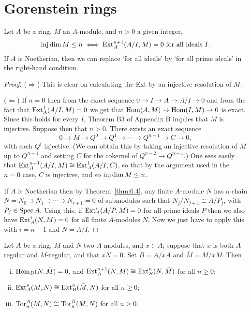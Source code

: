 \section{Gorenstein rings}\label{sec:18}

\begin{lemma}\label{lem:18.1}
Let $A$ be a ring, $M$ an $A$-module, and $n > 0$ a given integer,
\[
  \operatorname{inj\,dim} M \le n \iff \operatorname{Ext}^{n+1}_A(A/I, M) = 0 \text{ for all ideals } I.
\]
If $A$ is Noetherian, then we can replace `for all ideals' by `for all prime
ideals' in the right-hand condition.
\end{lemma}

\begin{proof}
($\Rightarrow$) This is clear on calculating the Ext by an injective resolution
of $M$.

($\Leftarrow$) If $n = 0$ then from the exact sequence $0 \to I \to A \to A/I \to 0$ and
from the fact that $\operatorname{Ext}^1_A(A/I, M) = 0$ we get that $\operatorname{Hom}(A, M) \to
\operatorname{Hom}(I, M) \to 0$ is exact. Since this holds for every $I$, Theorem B3 of
Appendix B implies that $M$ is injective. Suppose then that $n > 0$.
There exists an exact sequence
\[
  0 \to M \to Q^0 \to Q^1 \to \cdots \to Q^{n-1} \to C \to 0,
\]
with each $Q^i$ injective. (We can obtain this by taking an injective resolution
of $M$ up to $Q^{n-1}$ and setting $C$ for the cokernel of $Q^{n-2} \to Q^{n-1}$.)
One sees easily that $\operatorname{Ext}^{n+1}_A(A/I, M) \cong \operatorname{Ext}^1_A(A/I, C)$, so that by the argument
used in the $n = 0$ case, $C$ is injective, and so $\operatorname{inj\,dim} M \le n$.

If $A$ is Noetherian then by Theorem~\ref{thm:6.4}, any finite $A$-module $N$ has a
chain $N = N_0 \supset N_1 \supset \cdots \supset N_{r+1} = 0$ of submodules such that $N_j/N_{j+1} \cong
A/P_j$, with $P_j \in \operatorname{Spec} A$. Using this, if $\operatorname{Ext}^i_A(A/P, M) = 0$ for all prime ideals
$P$ then we also have $\operatorname{Ext}^i_A(N, M) = 0$ for all finite $A$-modules $N$. Now we
just have to apply this with $i = n + 1$ and $N = A/I$.
\end{proof}

\begin{lemma}\label{lem:18.2}
Let $A$ be a ring, $M$ and $N$ two $A$-modules, and $x \in A$;
suppose that $x$ is both $A$-regular and $M$-regular, and that $xN = 0$. Set $B = A/xA$ and
$\bar{M} = M/xM$. Then
\begin{enumerate}[(i)]
  \item $\operatorname{Hom}_B(N, \bar{M}) = 0$, and $\operatorname{Ext}^{n+1}_A(N, M) \cong \operatorname{Ext}^n_B(N, \bar{M})$ for all $n \ge 0$;
  \item $\operatorname{Ext}^n_A(M, N) \cong \operatorname{Ext}^n_B(\bar{M}, N)$ for all $n \ge 0$;
  \item $\operatorname{Tor}^A_n(M, N) \cong \operatorname{Tor}^B_n(\bar{M}, N)$ for all $n \ge 0$.
\end{enumerate}
\end{lemma}

